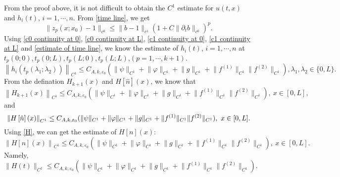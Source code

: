 \documentclass[a4paper,reqno,11pt]{amsart}
\numberwithin{equation}{section} %
\begin{document}
From the proof above, it is not difficult to obtain the $C^1$ estimate for $u(t,x)$ and $h_i(t)$, $i=1,\cdots,n$.
From \eqref{time line}, we get
\begin{equation}\label{estimate of time line}
	\lVert z_p\left( x;x_0 \right) -1 \rVert _{c^0}\leq \lVert b-1 \rVert _{c^1}\left( 1+C\lVert \partial _tb \rVert _{c^0} \right) ^p .
\end{equation}
Using \eqref{c0 continuity at 0}, \eqref{c0 continuity at L}, \eqref{c1 continuity at 0}, \eqref{c1 continuity at L} and \eqref{estimate of time line}, we know the estimate of $h_i(t)$, $i=1,\cdots,n$ at $t_p(0;0),t_p(0;L),t_p(L;0),t_p(L;L)$,$(p=1,\cdots,k+1)$.
\begin{equation}\label{estimate of h_i at t_p}
	\left\| h_i(t_p(\lambda _1;\lambda _2)) \right\|_{C^1} \leq C_{A,k,\varepsilon _0}(\lVert \psi \rVert _{C^1}+\lVert \varphi  \rVert _{C^1}+  \lVert g \rVert _{C^1}+\lVert f^{(1)} \rVert _{C^1}\lVert f^{(2)} \rVert _{C^1}) ,\lambda _1,\lambda _2 \in \{ 0,L \} .
\end{equation}
From the defination $H_{k+1}(x)$ and $H\left[ \hat{n} \right] \left( x \right)$, we know that
\begin{equation}\label{estimate of H}
	\left\| H_{k+1}(x) \right\|_{C^1} \leq C_{A,k,\varepsilon _0}(\lVert \psi \rVert _{C^1}+\lVert \varphi  \rVert _{C^1}+  \lVert g \rVert _{C^1}+\lVert f^{(1)} \rVert _{C^1}\lVert f^{(2)} \rVert _{C^1}) ,\ x\in [0,L],
\end{equation}
and
\begin{equation}\label{estimate of hat{H}}
	\left\| H\left[ \hat{n} \right] \left( x \right) \right\|_{C^1} \leq C_{A,k,\varepsilon _0}(\lVert \psi \rVert _{C^1}+\lVert \varphi  \rVert _{C^1}+  \lVert g \rVert _{C^1}+\lVert f^{(1)} \rVert _{C^1}\lVert f^{(2)} \rVert _{C^1}) ,\ x\in [0,L].
\end{equation}
Using \eqref{H}, we can get the estimate of $H\left[ n \right] \left( x \right)$:
\begin{equation}\label{estimate of H[n]}
	\left\| H\left[ n \right] \left( x \right) \right\|_{C^1} \leq C_{A,k,\varepsilon _0}(\lVert \psi \rVert _{C^1}+\lVert \varphi  \rVert _{C^1}+  \lVert g \rVert _{C^1}+\lVert f^{(1)} \rVert _{C^1}\lVert f^{(2)} \rVert _{C^1}) ,\ x\in [0,L].
\end{equation}
Namely, 
\begin{equation}\label{estimate of h}	
\lVert H(t) \rVert _{C^1}  \leq C_{A,k,\varepsilon _0}(\lVert \psi \rVert _{C^1}+\lVert \varphi  \rVert _{C^1}+  \lVert g \rVert _{C^1}+\lVert f^{(1)} \rVert _{C^1}\lVert f^{(2)} \rVert _{C^1}).
\end{equation}
\end{document}
